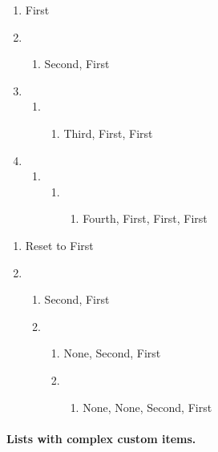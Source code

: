 \documentclass{article}
\begin{document}
\begin{enumerate}
\item First

\item 
\begin{enumerate}
\item Second, First
\end{enumerate}

\item 
\begin{enumerate}
\item 
\begin{enumerate}
\item Third, First, First
\end{enumerate}
\end{enumerate}

\item 
\begin{enumerate}
\item 
\begin{enumerate}
\item 
\begin{enumerate}
\item Fourth, First, First, First
\end{enumerate}
\end{enumerate}
\end{enumerate}
\end{enumerate}

\begin{enumerate}
\item Reset to First

\item 
\begin{enumerate}
\item Second, First

\item 
\begin{enumerate}
\item None, Second, First

\item 
\begin{enumerate}
\item None, None, Second, First
\end{enumerate}
\end{enumerate}
\end{enumerate}
\end{enumerate}

\paragraph{Lists with complex custom items.}
\end{document}
